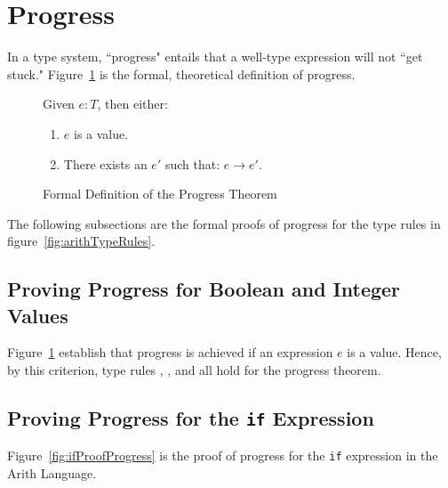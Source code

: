 \documentclass{report}
\newcommand{\rel}[1]{\mbox{\sc [#1]}}
\begin{document}
\eject
\section{Progress}\label{sec:progress}

In a type system, ``progress" entails that a well-type expression will not ``get stuck."  Figure~\ref{fig:progressTheorem} is the formal, theoretical definition of progress.

\begin{figure}[H]

	Given $e : T$, then either:
	
	\begin{enumerate}
	
      \item $e$ is a value.
      
      \item There exists an $e'$ such that: $e \rightarrow e'$.
	
	\end{enumerate}
	
  \caption{Formal Definition of the Progress Theorem}\label{fig:progressTheorem}
\end{figure}

The following subsections are the formal proofs of progress for the type rules in figure~\ref{fig:arithTypeRules}.

\subsection{Proving Progress for Boolean and Integer Values}

Figure~\ref{fig:progressTheorem} establish that progress is achieved if an expression $e$ is a value.  Hence, by this criterion, type rules \rel{T-True}, \rel{T-False}, and \rel{T-Int} all hold for the progress theorem.

\subsection{Proving Progress for the \texttt{if} Expression}

Figure~\ref{fig:ifProofProgress} is the proof of progress for the \texttt{if} expression in the Arith Language.
\end{document}
